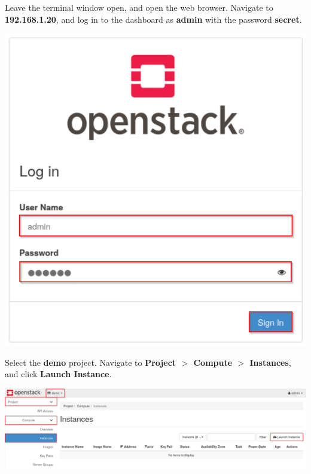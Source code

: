 \documentclass[letterpaper, 12pt]{article}
\begin{document}
\begin{enumerate}
    \begin{labstep}
        Leave the terminal window open, and open the web browser.
        Navigate to \textbf{192.168.1.20}, and log in to the dashboard as \textbf{admin} with the password \textbf{secret}.

        \begin{center}
            \includegraphics[scale=0.5]{images/part4/step5.png}
        \end{center}
    \end{labstep}

    \begin{labstep}
        Select the \textbf{demo} project.
        Navigate to \textbf{Project $>$ Compute $>$ Instances}, and click \textbf{Launch Instance}.

        \begin{center}
            \includegraphics[width=\linewidth]{images/part4/step6.png}
        \end{center}
    \end{labstep}


\end{enumerate}
\end{document}
